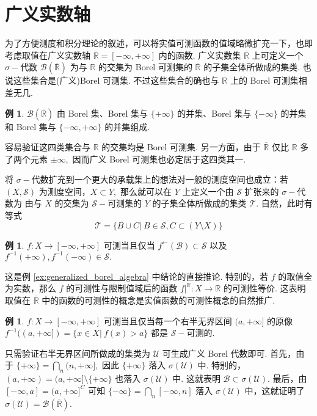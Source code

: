 \documentclass[12pt, a4paper, oneside]{book}
\numberwithin{figure}{section}
\theoremstyle{definition}
\newtheorem{example}[theorem]{例}
\begin{document}
\section{广义实数轴}
为了方便测度和积分理论的叙述，可以将实值可测函数的值域略微扩充一下，也即考虑取值在广义实数轴 $\overline{\mathbb R}=[-\infty,+\infty]$ 内的函数. 广义实数集 $\overline{\mathbb R}$ 上可定义一个 $\sigma-$代数 $\mathcal B(\overline{\mathbb R})$ 为与 $\mathbb R$ 的交集为 Borel 可测集的 $\overline{\mathbb R}$ 的子集全体所做成的集类.
也说这些集合是(广义)Borel 可测集. 不过这些集合的确也与 $\mathbb R$ 上的 Borel 可测集相差无几. 
\begin{example}\label{ex:generalized_borel_algebra}
    $\mathcal B(\overline{\mathbb R})$ 由 Borel 集、Borel 集与 $\{+\infty\}$ 的并集、Borel 集与 $\{-\infty\}$ 的并集和 Borel 集与 $\{-\infty,+\infty\}$ 的并集组成.
\end{example}
容易验证这四类集合与 $\mathbb R$ 的交集均是 Borel 可测集.  另一方面，由于 $\overline{\mathbb R}$ 仅比 $\mathbb R$ 多了两个元素 $\pm\infty,$ 因而广义 Borel 可测集也必定居于这四类其一.

将 $\sigma-$代数扩充到一个更大的承载集上的想法对一般的测度空间也成立：若 $(X,\mathcal S)$ 为测度空间，$X\subset Y,$ 那么就可以在 $Y$ 上定义一个由 $\mathcal S$ 扩张来的 $\sigma-$代数为 
由与 $X$ 的交集为 $\mathcal S-$可测集的 $Y$ 的子集全体所做成的集类 $\mathcal T.$ 自然，此时有等式
\begin{equation}
    \mathcal T=\{B\cup C|\ B\in\mathcal S, C\subset (Y\setminus X)\}
\end{equation}

\begin{example}
    $f:X\to [-\infty,+\infty]$ 可测当且仅当 $f^\leftarrow(\mathcal B)\subset\mathcal S$ 以及 $f^{-1}(+\infty),f^{-1}(-\infty)\in\mathcal S.$ 
\end{example}
这是例 \eqref{ex:generalized_borel_algebra} 中结论的直接推论. 特别的，若 $f$ 的取值全为实数，那么 $f$ 的可测性与限制值域后的函数 $f|^{\mathbb R}:X\to\mathbb R$ 的可测性等价.  
这表明取值在 $\overline{\mathbb R}$ 中的函数的可测性的概念是实值函数的可测性概念的自然推广.

\begin{example}
    $f:X\to [-\infty,+\infty]$ 可测当且仅当每一个右半无界区间 $(a,+\infty]$ 的原像 $f^{-1}((a,+\infty])=\{x\in X|\ f(x)>a\}$ 都是 $\mathcal S-$可测的.
\end{example}
只需验证右半无界区间所做成的集类为 $\mathcal U$ 可生成广义 Borel 代数即可.
首先，由于 $\{+\infty\}=\bigcap_n (n,+\infty],$ 因此 $\{+\infty\}$ 落入 $\sigma(\mathcal U)$ 中. 特别的，$(a,+\infty)=(a,+\infty]\setminus\{+\infty\}$ 也落入 $\sigma(\mathcal U)$ 中. 
这就表明 $\mathcal B\subset \sigma(\mathcal U).$ 最后，由 $[-\infty,a]=(a,+\infty]^C$ 可知 $\{-\infty\}=\bigcap_n [-\infty,n]$ 落入 $\sigma(\mathcal U)$ 中，这就证明了 $\sigma(\mathcal U)=\mathcal B(\overline{\mathbb R}).$
\end{document}
